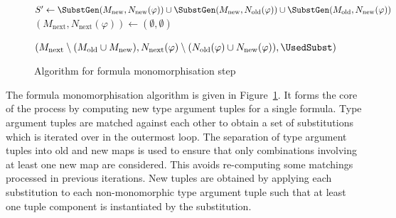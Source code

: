 \documentclass[runningheads]{llncs}
\begin{document}
\begin{figure}[t!]
\begin{algorithm}[H]
{   $S' \leftarrow \SubstGen(M_{\text{new}}, N_{\text{new}}(\varphi))
   \cup \SubstGen(M_{\text{new}}, N_{\text{old}}(\varphi))
   \cup \SubstGen(M_{\text{old}}, N_{\text{new}}(\varphi))$\;
   \((M_\text{next}, N_\text{next}(\varphi)) \leftarrow (\emptyset, \emptyset)\)\;

   \BlankLine

   \Return \((M_{\text{next}}\setminus (M_{\text{old}} \cup M_{\text{new}}), N_{\text{next}}(\varphi)\setminus (N_{\text{old}}(\varphi)\cup N_{\text{new}}(\varphi)), \UsedSubst)\)
}

\end{algorithm}
\caption{Algorithm for formula monomorphisation step}
\label{mono_step}
\end{figure}


The formula monomorphisation algorithm is given in Figure~\ref{mono_step}. It forms the core of the process by computing new type argument tuples for a single formula. Type argument tuples are matched against each other to obtain a set of substitutions which is iterated over in the outermost loop. 
The separation of type argument tuples into old and new maps is used to ensure that only combinations involving at least one new map are considered. This avoids re-computing some matchings processed in previous iterations. %
New tuples are obtained by applying
each substitution to each non-monomorphic type argument tuple such that at least one tuple component is instantiated by the substitution.
\end{document}
